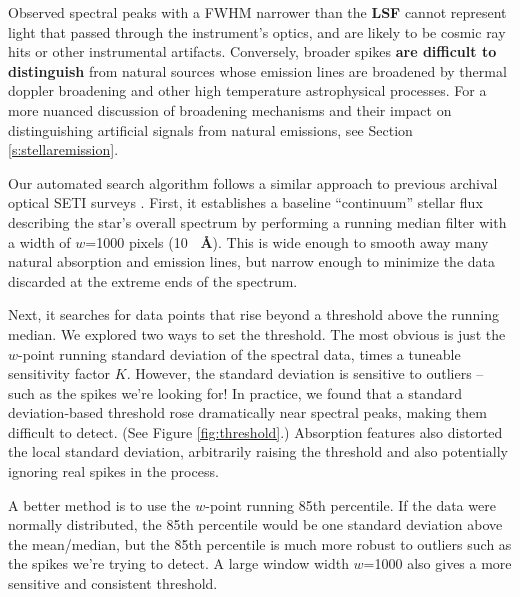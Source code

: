 \documentclass[linenumbers]{aastex701}
\providecommand{\DIFadd}[1]{{\bf #1}} %
\providecommand{\DIFaddbegin}{} %
\providecommand{\DIFaddend}{} %
\begin{document}
Observed spectral peaks with a FWHM narrower than the  \DIFaddbegin \DIFadd{LSF }\DIFaddend cannot represent light that passed through the instrument's optics, and are likely to be cosmic ray hits or other instrumental artifacts. Conversely, broader spikes  \DIFaddbegin \DIFadd{are difficult to distinguish }\DIFaddend from natural sources whose emission lines are broadened by thermal doppler broadening and other high temperature astrophysical processes. For a more nuanced discussion of broadening mechanisms and their impact on distinguishing artificial signals from natural emissions, see Section \ref{s:stellaremission}.

Our automated search algorithm follows a similar approach to previous archival optical SETI surveys \citep{Tellis_2017,Lipman_2019,Marcy_2021}. First, it establishes a baseline  \DIFaddbegin \enquote{continuum} \DIFaddend stellar flux describing the star's overall spectrum by performing a running median filter with a width of $w$=1000 pixels (10 \DIFaddbegin \DIFadd{~\AA}\DIFaddend ).  This is wide enough to smooth away many natural absorption and emission lines, but narrow enough to minimize the data discarded at the extreme ends of the spectrum. 

Next, it searches for data points that rise beyond a threshold above the running median.  We explored two ways to set the threshold.  The most obvious is just the $w$-point running standard deviation of the spectral data, times a tuneable sensitivity factor $K$.  However, the standard deviation is sensitive to outliers -- such as the spikes we're looking for!  In practice, we found that a standard deviation-based threshold rose dramatically near spectral peaks, making them difficult to detect. (See Figure \ref{fig:threshold}.) Absorption features also distorted the local standard deviation, arbitrarily raising the threshold and also potentially ignoring real spikes in the process.

A better method is to use the $w$-point running 85th percentile.  If the data were normally distributed, the 85th percentile would be one standard deviation above the mean/median, but the 85th percentile is much more robust to outliers such as the spikes we're trying to detect.  A large window width $w$=1000 also gives a more sensitive and consistent threshold.
\end{document}
